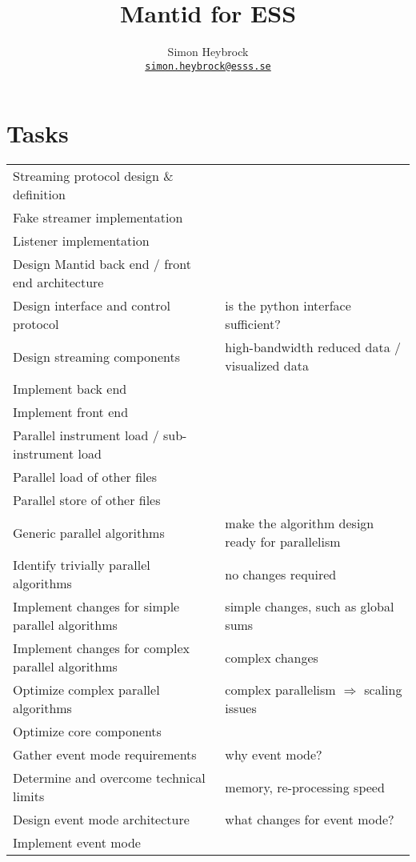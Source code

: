 \documentclass[a4paper,english,numbers=noenddot,bibliography=totoc,chapterprefix=on,DIV=12]{scrartcl}
\begin{document}
\title{Mantid for ESS}
\author{Simon Heybrock\\
    {\small\href{mailto:simon.heybrock@esss.se}{\nolinkurl{simon.heybrock@esss.se}}}}

\maketitle

\tableofcontents

\section{Tasks}

\begin{tabular}{ll}
    \hline
    \hline
    Streaming protocol design \& definition \\
    Fake streamer implementation \\
    Listener implementation \\
    \hline
    Design Mantid back end / front end architecture \\
    Design interface and control protocol & is the python interface sufficient?\\
    Design streaming components & high-bandwidth reduced data / visualized data \\
    Implement back end \\
    Implement front end \\
    \hline
    Parallel instrument load / sub-instrument load \\
    Parallel load of other files \\
    Parallel store of other files \\
    \hline
    Generic parallel algorithms & make the algorithm design ready for parallelism \\
    Identify trivially parallel algorithms & no changes required \\
    Implement changes for simple parallel algorithms & simple changes, such as global sums \\
    Implement changes for complex parallel algorithms & complex changes \\
    Optimize complex parallel algorithms & complex parallelism $\Rightarrow$ scaling issues \\
    \hline
    Optimize core components \\
    \hline
    Gather event mode requirements & why event mode? \\
    Determine and overcome technical limits & memory, re-processing speed \\
    Design event mode architecture & what changes for event mode? \\
    Implement event mode \\
    \hline
    \hline
\end{tabular}
\end{document}
